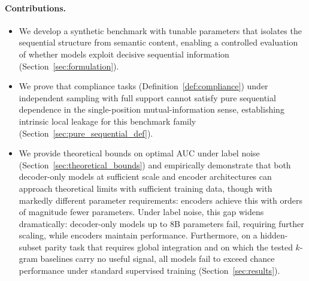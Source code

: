 \documentclass{article}
\theoremstyle{plain}
\theoremstyle{definition}
\theoremstyle{remark}
\begin{document}
\paragraph{Contributions.}
\begin{itemize}
    \item We develop a synthetic benchmark with tunable parameters that isolates the sequential structure from semantic content, enabling a controlled evaluation of whether models exploit decisive sequential information (Section~\ref{sec:formulation}).
    \item We prove that compliance tasks (Definition~\ref{def:compliance}) under independent sampling with full support cannot satisfy pure sequential dependence in the single-position mutual-information sense, establishing intrinsic local leakage for this benchmark family (Section~\ref{sec:pure_sequential_def}).
    \item We provide theoretical bounds on optimal AUC under label noise (Section~\ref{sec:theoretical_bounds}) and empirically demonstrate that both decoder-only models at sufficient scale and encoder architectures can approach theoretical limits with sufficient training data, though with markedly different parameter requirements: encoders achieve this with orders of magnitude fewer parameters. Under label noise, this gap widens dramatically: decoder-only models up to 8B parameters fail, requiring further scaling, while encoders maintain performance. Furthermore, on a hidden-subset parity task that requires global integration and on which the tested $k$-gram baselines carry no useful signal, all models fail to exceed chance performance under standard supervised training (Section~\ref{sec:results}).
\end{itemize}
\end{document}
